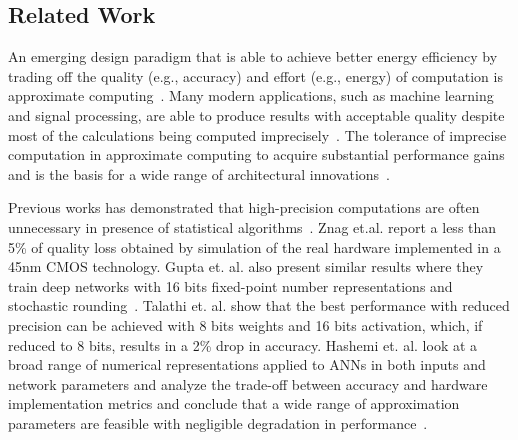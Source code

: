\documentclass[a4paper,10pt]{article}
\begin{document}
\subsection{Related Work}
 An emerging design paradigm that is able to achieve better energy efficiency by trading off the quality (e.g., accuracy) and effort (e.g., energy) of computation is approximate computing~\cite{Zhang2014}. Many modern applications, such as machine learning and signal processing, are able to produce results with acceptable quality despite most of the calculations being computed imprecisely~\cite{Ye2013}. The tolerance of imprecise computation in approximate computing  to acquire substantial performance gains and is the basis for a wide range of architectural innovations~\cite{Esmaeilzadeh2012}.




Previous works has demonstrated that high-precision computations are often unnecessary in presence of statistical algorithms~\cite{Moons2017,Zhang2015}. Znag et.al. report a less than 5\% of quality loss  obtained by simulation of the real hardware implemented in a 45nm CMOS technology. Gupta et. al. also present similar results where they train deep networks with 16 bits fixed-point number representations and stochastic rounding~\cite{Gupta2015}. Talathi et. al. show that  the best performance with reduced precision  can be  achieved with 8 bits weights and 16 bits activation, which, if reduced to 8 bits, results in  a 2\% drop in accuracy. Hashemi et. al. look at a broad range of numerical representations applied to ANNs in both inputs and network parameters and analyze the trade-off between accuracy and hardware implementation metrics and conclude that a wide range of approximation parameters are feasible with negligible degradation in performance~\cite{Hashemi2017}.
\end{document}
